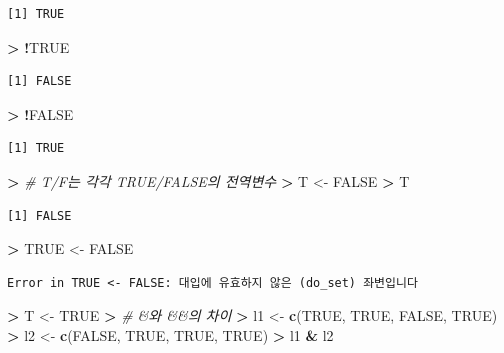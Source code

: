 \documentclass[11pt,a4paper]{book}
\newenvironment{Shaded}{\begin{snugshade}}{\end{snugshade}}
\newcommand{\KeywordTok}[1]{\textcolor[rgb]{0.13,0.29,0.53}{\textbf{#1}}}
\newcommand{\StringTok}[1]{\textcolor[rgb]{0.31,0.60,0.02}{#1}}
\newcommand{\CommentTok}[1]{\textcolor[rgb]{0.56,0.35,0.01}{\textit{#1}}}
\newcommand{\OtherTok}[1]{\textcolor[rgb]{0.56,0.35,0.01}{#1}}
\newcommand{\OperatorTok}[1]{\textcolor[rgb]{0.81,0.36,0.00}{\textbf{#1}}}
\newcommand{\ErrorTok}[1]{\textcolor[rgb]{0.64,0.00,0.00}{\textbf{#1}}}
\newcommand{\NormalTok}[1]{#1}
\theoremstyle{definition}
\theoremstyle{definition}
\theoremstyle{definition}
\theoremstyle{remark}
\begin{document}
\begin{verbatim}
[1] TRUE
\end{verbatim}

\begin{Shaded}
\begin{Highlighting}[]
\OperatorTok{>}\StringTok{ }\OperatorTok{!}\OtherTok{TRUE}
\end{Highlighting}
\end{Shaded}

\begin{verbatim}
[1] FALSE
\end{verbatim}

\begin{Shaded}
\begin{Highlighting}[]
\OperatorTok{>}\StringTok{ }\OperatorTok{!}\OtherTok{FALSE}
\end{Highlighting}
\end{Shaded}

\begin{verbatim}
[1] TRUE
\end{verbatim}

\begin{Shaded}
\begin{Highlighting}[]
\OperatorTok{>}\StringTok{ }\CommentTok{# T/F는 각각 TRUE/FALSE의 전역변수}
\ErrorTok{>}\StringTok{ }\NormalTok{T <-}\StringTok{ }\OtherTok{FALSE}
\OperatorTok{>}\StringTok{ }\NormalTok{T}
\end{Highlighting}
\end{Shaded}

\begin{verbatim}
[1] FALSE
\end{verbatim}

\begin{Shaded}
\begin{Highlighting}[]
\OperatorTok{>}\StringTok{ }\OtherTok{TRUE}\NormalTok{ <-}\StringTok{ }\OtherTok{FALSE}
\end{Highlighting}
\end{Shaded}

\begin{verbatim}
Error in TRUE <- FALSE: 대입에 유효하지 않은 (do_set) 좌변입니다
\end{verbatim}

\begin{Shaded}
\begin{Highlighting}[]
\OperatorTok{>}\StringTok{ }\NormalTok{T <-}\StringTok{ }\OtherTok{TRUE}
\OperatorTok{>}\StringTok{ }\CommentTok{# &와 &&의 차이}
\ErrorTok{>}\StringTok{ }\NormalTok{l1 <-}\StringTok{ }\KeywordTok{c}\NormalTok{(}\OtherTok{TRUE}\NormalTok{, }\OtherTok{TRUE}\NormalTok{, }\OtherTok{FALSE}\NormalTok{, }\OtherTok{TRUE}\NormalTok{)}
\OperatorTok{>}\StringTok{ }\NormalTok{l2 <-}\StringTok{ }\KeywordTok{c}\NormalTok{(}\OtherTok{FALSE}\NormalTok{, }\OtherTok{TRUE}\NormalTok{, }\OtherTok{TRUE}\NormalTok{, }\OtherTok{TRUE}\NormalTok{)}
\OperatorTok{>}\StringTok{ }\NormalTok{l1 }\OperatorTok{&}\StringTok{ }\NormalTok{l2}
\end{Highlighting}
\end{Shaded}
\end{document}
